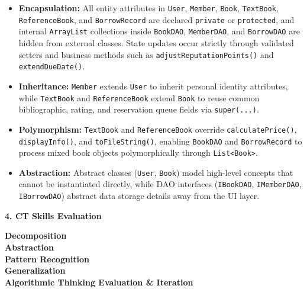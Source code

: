 \documentclass[12pt,a4paper]{article}
\begin{document}
\begin{itemize}[leftmargin=1.2cm]
    \item \textbf{Encapsulation:} All entity attributes in \texttt{User}, \texttt{Member}, \texttt{Book}, \texttt{TextBook}, \texttt{ReferenceBook}, and \texttt{BorrowRecord} are declared \texttt{private} or \texttt{protected}, and internal \texttt{ArrayList} collections inside \texttt{BookDAO}, \texttt{MemberDAO}, and \texttt{BorrowDAO} are hidden from external classes. State updates occur strictly through validated setters and business methods such as \texttt{adjustReputationPoints()} and \texttt{extendDueDate()}.
    \item \textbf{Inheritance:} \texttt{Member} extends \texttt{User} to inherit personal identity attributes, while \texttt{TextBook} and \texttt{ReferenceBook} extend \texttt{Book} to reuse common bibliographic, rating, and reservation queue fields via \texttt{super(...)}.
    \item \textbf{Polymorphism:} \texttt{TextBook} and \texttt{ReferenceBook} override \texttt{calculatePrice()}, \texttt{displayInfo()}, and \texttt{toFileString()}, enabling \texttt{BookDAO} and \texttt{BorrowRecord} to process mixed book objects polymorphically through \texttt{List<Book>}.
    \item \textbf{Abstraction:} Abstract classes (\texttt{User}, \texttt{Book}) model high-level concepts that cannot be instantiated directly, while DAO interfaces (\texttt{IBookDAO}, \texttt{IMemberDAO}, \texttt{IBorrowDAO}) abstract data storage details away from the UI layer.
\end{itemize}

\textbf{4. CT Skills Evaluation}

\textbf{Decomposition}\\
\textbf{Abstraction}\\
\textbf{Pattern Recognition}\\
\textbf{Generalization}\\
\textbf{Algorithmic Thinking Evaluation \& Iteration}
\end{document}
